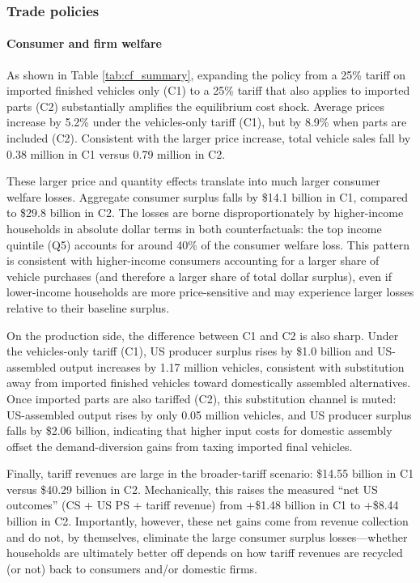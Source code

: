 \documentclass[11pt]{article}
\begin{document}
\subsubsection{Trade policies}

\paragraph{Consumer and firm welfare}
As shown in Table \ref{tab:cf_summary}, expanding the policy from a 25\% tariff on imported finished vehicles only (C1) to a 25\% tariff that also applies to imported parts (C2) substantially amplifies the equilibrium cost shock. Average prices increase by 5.2\% under the vehicles-only tariff (C1), but by 8.9\% when parts are included (C2). Consistent with the larger price increase, total vehicle sales fall by 0.38 million in C1 versus 0.79 million in C2.

These larger price and quantity effects translate into much larger consumer welfare losses. Aggregate consumer surplus falls by \$14.1 billion in C1, compared to \$29.8 billion in C2. The losses are borne disproportionately by higher-income households in absolute dollar terms in both counterfactuals: the top income quintile (Q5) accounts for around 40\% of the consumer welfare loss. This pattern is consistent with higher-income consumers accounting for a larger share of vehicle purchases (and therefore a larger share of total dollar surplus), even if lower-income households are more price-sensitive and may experience larger losses relative to their baseline surplus.

On the production side, the difference between C1 and C2 is also sharp. Under the vehicles-only tariff (C1), US producer surplus rises by \$1.0 billion and US-assembled output increases by 1.17 million vehicles, consistent with substitution away from imported finished vehicles toward domestically assembled alternatives. Once imported parts are also tariffed (C2), this substitution channel is muted: US-assembled output rises by only 0.05 million vehicles, and US producer surplus falls by \$2.06 billion, indicating that higher input costs for domestic assembly offset the demand-diversion gains from taxing imported final vehicles.

Finally, tariff revenues are large in the broader-tariff scenario: \$14.55 billion in C1 versus \$40.29 billion in C2. Mechanically, this raises the measured “net US outcomes” (CS + US PS + tariff revenue) from +\$1.48 billion in C1 to +\$8.44 billion in C2. Importantly, however, these net gains come from revenue collection and do not, by themselves, eliminate the large consumer surplus losses—whether households are ultimately better off depends on how tariff revenues are recycled (or not) back to consumers and/or domestic firms.
\end{document}
